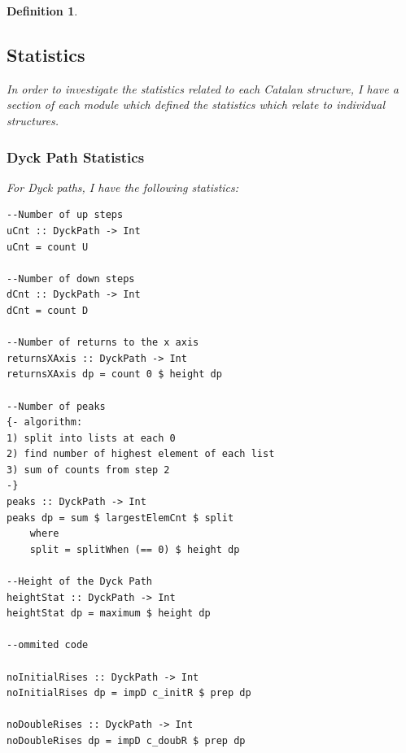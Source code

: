 \documentclass[12pt]{article}
\newtheorem{definition}{Definition}
\begin{document}
\begin{definition}
\subsection{Statistics}
In order to investigate the statistics related to each Catalan structure, I have a section of each module which defined the statistics which relate to individual structures.\\

\subsubsection{Dyck Path Statistics}
For Dyck paths, I have the following statistics:
\begin{lstlisting}
--Number of up steps
uCnt :: DyckPath -> Int
uCnt = count U 

--Number of down steps
dCnt :: DyckPath -> Int
dCnt = count D 

--Number of returns to the x axis
returnsXAxis :: DyckPath -> Int
returnsXAxis dp = count 0 $ height dp

--Number of peaks
{- algorithm:
1) split into lists at each 0
2) find number of highest element of each list
3) sum of counts from step 2
-}
peaks :: DyckPath -> Int
peaks dp = sum $ largestElemCnt $ split
	where
	split = splitWhen (== 0) $ height dp

--Height of the Dyck Path
heightStat :: DyckPath -> Int 
heightStat dp = maximum $ height dp

--ommited code

noInitialRises :: DyckPath -> Int
noInitialRises dp = impD c_initR $ prep dp

noDoubleRises :: DyckPath -> Int
noDoubleRises dp = impD c_doubR $ prep dp


\end{lstlisting}
\end{definition}
\end{document}
